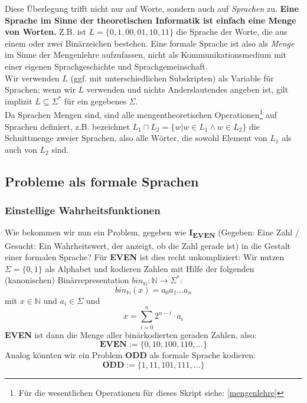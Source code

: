Diese Überlegung trifft nicht nur auf Worte, sondern auch auf \emph{Sprachen} zu.
\textbf{Eine Sprache im Sinne der theoretischen Informatik ist einfach eine Menge von Worten.}
Z.B. ist $L = \{0, 1, 00, 01, 10, 11 \}$ die Sprache der Worte,
die aus einem oder zwei Binärzeichen bestehen.
Eine formale Sprache ist also als \emph{Menge} im Sinne der Mengenlehre aufzufassen, 
nicht als Kommunikationsmedium mit einer eigenen Sprachgeschichte und Sprachgemeinschaft.\\

\noindent
Wir verwenden $L$ (ggf. mit unterschiedlichen Subskripten) als Variable für Sprachen;
wenn wir $L$ verwenden und nichts Anderslautendes angeben ist,
gilt implizit $L \subseteq \Sigma^*$ für ein gegebenes $\Sigma$.\\

\noindent
Da Sprachen Mengen sind,
sind alle mengentheoretischen Operationen\footnote{
    Für die wesentlichen Operationen für dieses Skript siehe: \autoref{mengenlehre}}
auf Sprachen definiert,
z.B. bezeichnet $L_1 \cap L_2 = \{w | w \in L_1 \wedge w \in L_2\}$
die Schnittmenge zweier Sprachen, also alle Wörter,
die sowohl Element von $L_1$ als auch von $L_2$ sind.



\subsection{Probleme als formale Sprachen}\label{subsec:problemeAlsFormaleSprachen}

\subsubsection{Einstellige Wahrheitsfunktionen}
Wie bekommen wir nun ein Problem, gegeben wie \textbf{I\textsubscript{EVEN}} 
(Gegeben: Eine Zahl / Gesucht: Ein Wahrheitswert, der anzeigt, ob die Zahl gerade ist)
in die Gestalt einer formalen Sprache?
Für \textbf{EVEN} ist dies recht unkompliziert:
Wir nutzen $\Sigma = \{0,1\}$ als Alphabet
und kodieren Zahlen mit Hilfe der folgenden (kanonischen) Binärrepresentation
$bin_{\mathbb{N}}: \mathbb{N} \rightarrow \Sigma^*$:
\[
    bin_{\mathbb{N}}(x) = a_{0}a_{1} \ldots a_{n}
\]
mit $x \in \mathbb{N}$ und $a_i \in \Sigma$ und 
\[
    x = \sum_{i=0}^n 2^{n-i} \cdot a_i
\]
\textbf{EVEN} ist dann die Menge aller binärkodierten geraden Zahlen, also:
\[
    \mathbf{EVEN} := \{0, 10, 100, 110, \ldots\}
\]
Analog könnten wir ein Problem \textbf{ODD} als formale Sprache kodieren:
\[
    \mathbf{ODD} := \{1, 11, 101, 111, \ldots \}
\]

